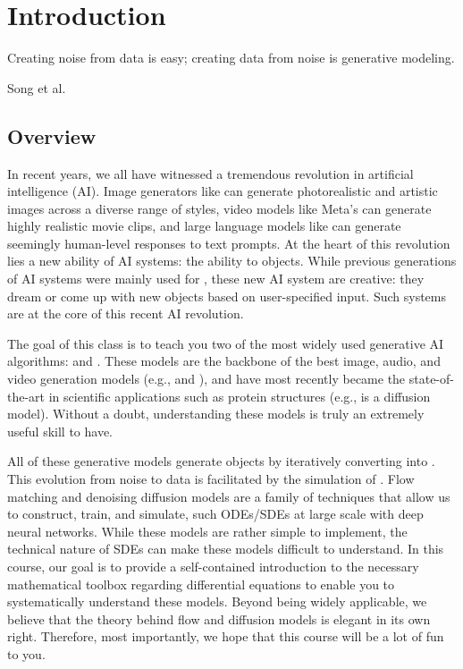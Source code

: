 \section{Introduction}
\label{sec:introduction}
\epigraph{Creating noise from data is easy; creating data from noise is generative modeling.}{Song et al. \cite{yangsong_sde}}


\subsection{Overview}
In recent years, we all have witnessed a tremendous revolution in artificial intelligence (AI). 
Image generators like  can generate photorealistic and artistic images across a diverse range of styles, video models like Meta's  can generate highly realistic movie clips, and large language models like  can generate seemingly human-level responses to text prompts. At the heart of this revolution lies a new ability of AI systems: the ability to  objects. While previous generations of AI systems were mainly used for , these new AI system are creative: they dream or come up with new objects based on user-specified input. Such  systems are at the core of this recent AI revolution.  

The goal of this class is to teach you two of the most widely used generative AI algorithms:  \citep{song2020score} and  \citep{lipman2022flow,liu2022flow, albergo2023stochastic, lipman2024flow}. These models are the backbone of the best image, audio, and video generation models (e.g.,  and ), and have most recently became the state-of-the-art in scientific applications such as protein structures (e.g.,  is a diffusion model). Without a doubt, understanding these models is truly an extremely useful skill to have.

All of these generative models generate objects by iteratively converting   into . This evolution from noise to data is facilitated by the simulation of . Flow matching and denoising diffusion models are a family of techniques that allow us to construct, train, and simulate, such ODEs/SDEs at large scale with deep neural networks. While these models are rather simple to implement, the technical nature of SDEs can make these models difficult to understand. In this course, our goal is to provide a self-contained introduction to the necessary mathematical toolbox regarding differential equations to enable you to systematically understand these models. Beyond being widely applicable, we believe that the theory behind flow and diffusion models is elegant in its own right. Therefore, most importantly, we hope that this course will be a lot of fun to you. 

